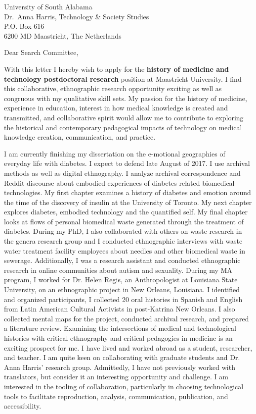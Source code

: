 \documentclass[10pt,a4paper]{letter}
\begin{document}
 
  \begin{letter}{University of South Alabama \\ Dr.~Anna Harris, Technology \& Society Studies \\ P.O. Box 616 \\ 6200 MD Maastricht, The Netherlands} 
  \opening{Dear Search Committee,} 
  With this letter I hereby wish to apply for the \textbf{history of medicine and technology postdoctoral research} position at Maastricht University. I find this collaborative, ethnographic research opportunity exciting as well as congruous with my qualitative skill sets. My passion for the history of medicine, experience in education, interest in how medical knowledge is created and transmitted, and  collaborative spirit would allow me to contribute to exploring the historical and contemporary pedagogical impacts of technology on medical knowledge creation, communication, and practice.
  
  I am currently finishing my dissertation on the e-motional geographies
  of everyday life with diabetes. I expect to defend late August of 2017.
  I use archival methods as well as digital ethnography. I analyze
  archival correspondence and Reddit discourse about embodied experiences
  of diabetes related biomedical technologies. My first chapter examines a history of diabetes and emotion around the time of the discovery of insulin at the University of Toronto. My next chapter explores diabetes, embodied technology and the quantified self. My final chapter looks at flows of personal biomedical waste generated through the treatment of diabetes.  
  During my PhD, I also collaborated with others on waste research in the genera research group and I conducted ethnographic interviews with waste water treatment facility employees
  about needles and other biomedical waste in sewerage. Additionally, I was a research assistant and conducted ethnographic research in online communities about autism and sexuality.
  During my MA program, I worked for Dr. Helen Regis, an Anthropologist at
  Louisiana State University, on an ethnographic project in New Orleans,
  Louisiana. I identified and organized participants, I collected 20 oral
  histories in Spanish and English from Latin American Cultural Activists
  in post-Katrina New Orleans. I also collected mental maps for the
  project, conducted archival research, and prepared a literature review.
  Examining the intersections of medical and technological histories with
  critical ethnography and critical pedagogies in medicine is an exciting
  prospect for me. I have lived and worked abroad as a student,
  researcher, and teacher. I am quite keen on collaborating with graduate
  students and Dr. Anna Harris' research group. Admittedly, I have not previously worked
  with translators, but consider it an interesting opportunity and challenge.
  I am interested in the tooling of collaboration, particularly in
  choosing technological tools to facilitate reproduction, analysis,
  communication, publication, and accessibility.
  

\end{letter}
\end{document}
